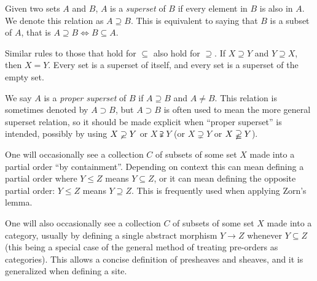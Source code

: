 \documentclass[12pt]{article}
\begin{document}

Given two sets $A$ and $B$, $A$ is a \emph{superset} of $B$ if every element in $B$ is also in $A$.  We denote this relation as $A\supseteq B$.  This is equivalent to saying that $B$ is a subset of $A$, that is $A\supseteq B \Leftrightarrow B\subseteq A$.

Similar rules to those that hold for $\subseteq$ also hold for $\supseteq$.
If $X\supseteq Y$ and $Y\supseteq X$, then $X = Y$.
Every set is a superset of itself, and every set is a superset of the empty set.

We say $A$ is a \emph{proper superset} of $B$ if $A \supseteq B$ and $A \neq B$.  This relation is sometimes denoted by $A \supset B$,
but $A \supset B$ is often used to mean the more general superset relation,
so it should be made explicit when ``proper superset'' is intended,
possibly by using $X\varsupsetneq Y$ or $X\supsetneqq Y$ (or $X\supsetneq Y$ or $X\varsupsetneqq Y$).

One will occasionally see a collection $C$ of subsets of some set $X$ made into a partial order ``by containment''.  Depending on context this can mean defining a partial order where $Y\leq Z$ means $Y \subseteq Z$, or it can mean defining the opposite partial order: $Y\leq Z$ means $Y \supseteq Z$.  This is frequently used when applying Zorn's lemma. 

One will also occasionally see a collection $C$ of subsets of some set $X$ made into a category, usually by defining a single abstract morphism $Y\to Z$ whenever $Y\subseteq Z$ (this being a special case of the general method of treating pre-orders as categories).  This allows a concise definition of presheaves and sheaves, and it is generalized when defining a site.
\end{document}
